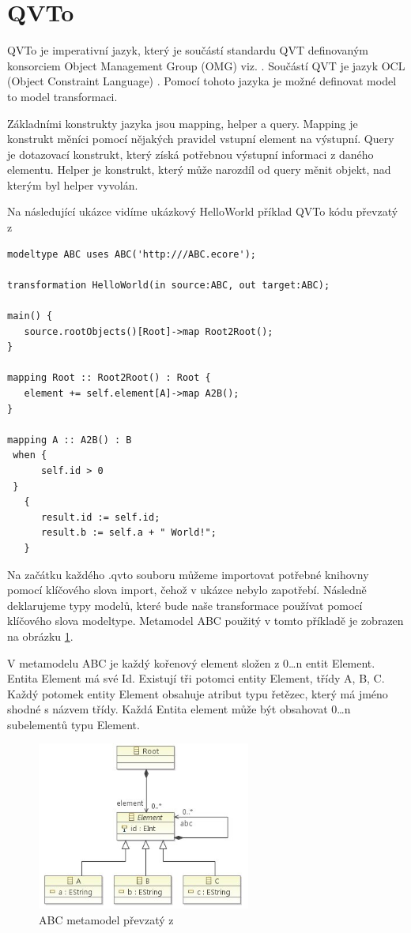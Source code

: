 \documentclass[11pt,twoside,a4paper]{book}
\begin{document}
\section{QVTo}
QVTo je imperativní jazyk, který je součástí standardu QVT definovaným
konsorciem Object Management Group (OMG) viz. \cite{OMG}. Součástí QVT je
jazyk OCL (Object Constraint Language) \cite{OCL}. Pomocí tohoto jazyka je možné
definovat model to model transformaci.

Základními konstrukty jazyka jsou mapping, helper a query. Mapping je konstrukt
měníci pomocí nějakých pravidel vstupní element na výstupní. Query je
dotazovací konstrukt, který získá potřebnou výstupní informaci z daného
elementu. Helper je konstrukt, který může narozdíl od query měnit objekt, nad
kterým byl helper vyvolán.

Na následující ukázce vidíme ukázkový HelloWorld příklad QVTo kódu převzatý z
\cite{QVTO_Example}


\begin{verbatim}
modeltype ABC uses ABC('http:///ABC.ecore');

transformation HelloWorld(in source:ABC, out target:ABC);

main() {
   source.rootObjects()[Root]->map Root2Root();
}

mapping Root :: Root2Root() : Root {
   element += self.element[A]->map A2B();
}

mapping A :: A2B() : B
 when {
      self.id > 0
 }
   {
      result.id := self.id;
      result.b := self.a + " World!";
   }
\end{verbatim}


Na začátku každého .qvto souboru můžeme importovat potřebné knihovny
pomocí klíčového slova import, čehož v ukázce nebylo zapotřebí. Následně
deklarujeme typy modelů, které bude naše transformace používat pomocí klíčového
slova modeltype. Metamodel ABC použitý v tomto příkladě je zobrazen na obrázku
\ref{fig:qvto_example}. 

V metamodelu ABC je každý kořenový element složen z 0\ldots n entit Element.
Entita Element má své Id. Existují tři potomci entity Element, třídy A, B, C.
Každý potomek entity Element obsahuje atribut typu řetězec, který má jméno
shodné s názvem třídy. Každá Entita element může být obsahovat 0\ldots n
subelementů typu Element.

\begin{figure}[h]
\begin{center}
\includegraphics[width=7cm]{figures/qvto_example_metamodel}
\caption{ABC metamodel převzatý z \cite{QVTO_Example}}
\label{fig:qvto_example}
\end{center}
\end{figure}
\FloatBarrier
\end{document}
